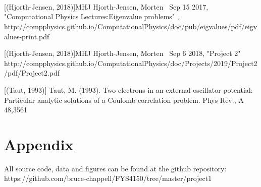 \documentclass{emulateapj}
\begin{document}
\\
\\
\\
\newpage
\begin{thebibliography}{}
[(Hjorth-Jensen, 2018)]{MHJ} Hjorth-Jensen, Morten \, Sep 15 2017, "Computational Physics Lectures:Eigenvalue problems" , http://compphysics.github.io/ComputationalPhysics/doc/pub/eigvalues/pdf/eigvalues-print.pdf

[(Hjorth-Jensen, 2018)]{MHJ} Hjorth-Jensen, Morten \, Sep 6 2018, "Project 2"
http://compphysics.github.io/ComputationalPhysics/doc/Projects/2019/Project2/pdf/Project2.pdf

[(Taut, 1993)] Taut, M. (1993). Two electrons in an external oscillator potential: Particular analytic solutions of a Coulomb correlation problem. Phys Rev., A 48,3561

\end{thebibliography}

\section{Appendix}
All source code, data and figures can be found at the github repository: https://github.com/bruce-chappell/FYS4150/tree/master/project1
\end{document}
